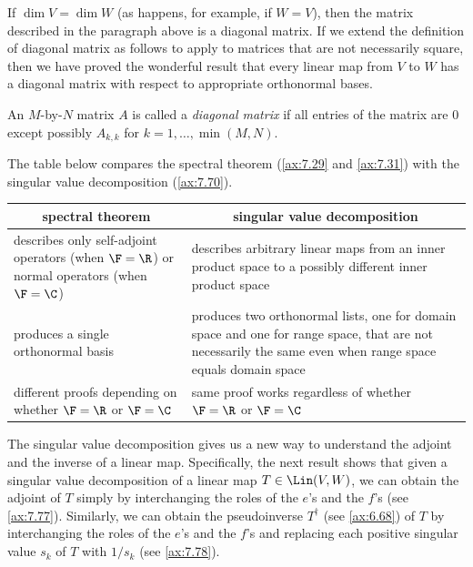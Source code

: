 If $\dim V=\dim W$ (as happens, for example, if $W=V$), then the matrix
described in the paragraph above is a diagonal matrix. If we extend the
definition of diagonal matrix as follows to apply to matrices that are not
necessarily square, then we have proved the wonderful result that every linear
map from $V$ to $W$ has a diagonal matrix with respect to appropriate
orthonormal bases.

\begin{definition}\label{ax:7.74}
An $M$-by-$N$ matrix $A$ is called a \emph{diagonal matrix} if all entries of
the matrix are $0$ except possibly $A_{k,k}$ for $k=1,\dots,\min(M,N)$.
\end{definition}

The table below compares the spectral theorem (\ref{ax:7.29} and
\ref{ax:7.31}) with the singular value decomposition (\ref{ax:7.70}).

\begin{center}\small
\begin{tabular}{|p{.44\linewidth}|p{.44\linewidth}|}
\hline
\multicolumn{1}{|c|}{\textbf{spectral theorem}} &
\multicolumn{1}{c|}{\textbf{singular value decomposition}}\\
\hline
describes only self-adjoint operators (when $\F=\R$) or normal operators (when
$\F=\C$) &
describes arbitrary linear maps from an inner product space to a possibly
different inner product space\\
\hline
produces a single orthonormal basis &
produces two orthonormal lists, one for domain space and one for range space,
that are not necessarily the same even when range space equals domain space\\
\hline
different proofs depending on whether $\F=\R$ or $\F=\C$ &
same proof works regardless of whether $\F=\R$ or $\F=\C$\\
\hline
\end{tabular}
\end{center}

The singular value decomposition gives us a new way to understand the adjoint
and the inverse of a linear map. Specifically, the next result shows that given
a singular value decomposition of a linear map $T\in\Lin(V,W)$, we can obtain
the adjoint of $T$ simply by interchanging the roles of the $e$'s and the
$f$'s (see \ref{ax:7.77}). Similarly, we can obtain the pseudoinverse
$T^\dagger$ (see \ref{ax:6.68}) of $T$ by interchanging the roles of the $e$'s
and the $f$'s and replacing each positive singular value $s_k$ of $T$ with
$1/s_k$ (see \ref{ax:7.78}).

